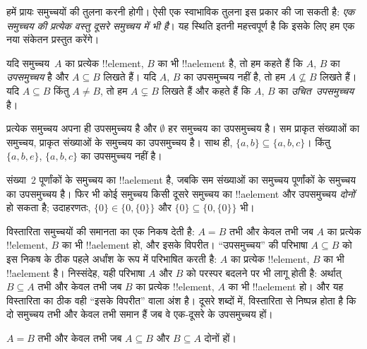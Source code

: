 \documentclass[../../../include/open-logic-section]{subfiles}
\begin{document}

\begin{explain}
हमें प्रायः समुच्चयों की तुलना करनी होगी। ऐसी एक स्वाभाविक तुलना इस प्रकार
की जा सकती है: \emph{एक समुच्चय की प्रत्येक वस्तु दूसरे समुच्चय में भी है}।
यह स्थिति इतनी महत्त्वपूर्ण है कि इसके लिए हम एक नया संकेतन प्रस्तुत करेंगे।
\end{explain}

\begin{defn}[उपसमुच्चय]
यदि समुच्चय~$A$ का प्रत्येक !!{element}, $B$ का भी !!a{element} है, तो हम
कहते हैं कि $A$, $B$ का \emph{उपसमुच्चय} है और $A \subseteq B$ लिखते हैं।
यदि $A$, $B$ का उपसमुच्चय नहीं है, तो हम $A \not\subseteq B$ लिखते हैं।
यदि $A \subseteq B$ किंतु $A \neq B$, तो हम $A \subsetneq B$ लिखते हैं और
कहते हैं कि $A$, $B$ का \emph{उचित~उपसमुच्चय} है।
\end{defn}

\begin{ex}
प्रत्येक समुच्चय अपना ही उपसमुच्चय है और $\emptyset$ हर समुच्चय का
उपसमुच्चय है। सम प्राकृत संख्याओं का समुच्चय, प्राकृत संख्याओं के समुच्चय का
उपसमुच्चय है। साथ ही, $\{ a, b \} \subseteq \{ a, b, c \}$। किंतु
$\{ a, b, e \}$, $\{ a, b, c \}$ का उपसमुच्चय नहीं है।
\end{ex}

\begin{ex}
संख्या~$2$ पूर्णांकों के समुच्चय का !!a{element} है, जबकि सम संख्याओं का
समुच्चय पूर्णांकों के समुच्चय का उपसमुच्चय है। फिर भी कोई समुच्चय किसी दूसरे
समुच्चय का !!a{element} और उपसमुच्चय \emph{दोनों} हो सकता है; उदाहरणतः,
$\{0\} \in \{0, \{0\}\}$ और $\{0\} \subseteq \{0, \{0\}\}$ भी।
\end{ex}

विस्तारिता समुच्चयों की समानता का एक निकष देती है: $A = B$ तभी और केवल तभी
जब $A$ का प्रत्येक !!{element}, $B$ का भी !!a{element} हो, और इसके विपरीत।
``उपसमुच्चय'' की परिभाषा $A \subseteq B$ को इस निकष के ठीक पहले अर्धांश के
रूप में परिभाषित करती है: $A$ का प्रत्येक !!{element}, $B$ का भी
!!a{element} है। निस्संदेह, यही परिभाषा $A$ और $B$ को परस्पर बदलने पर भी
लागू होती है: अर्थात् $B \subseteq A$ तभी और केवल तभी जब $B$ का प्रत्येक
!!{element}, $A$ का भी !!a{element} हो। और यह विस्तारिता का ठीक वही
``इसके विपरीत'' वाला अंश है। दूसरे शब्दों में, विस्तारिता से निष्पन्न होता है
कि दो समुच्चय तभी और केवल तभी समान हैं जब वे एक-दूसरे के उपसमुच्चय हों।

\begin{prop}
$A = B$ तभी और केवल तभी जब $A \subseteq B$ और $B \subseteq A$ दोनों हों।
\end{prop}
\end{document}
